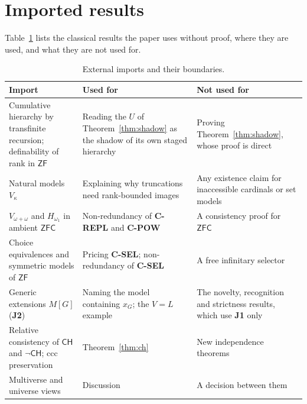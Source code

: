 \section{Imported results}\label{app:extended-material}

Table~\ref{tab:imports-ledger} lists the classical results the paper uses without proof, where
they are used, and what they are not used for.

\begin{table}[htbp]
\centering
\footnotesize
\begin{tabularx}{\textwidth}{@{}>{\raggedright\arraybackslash}p{}>{\raggedright\arraybackslash}p{}>{\raggedright\arraybackslash}X@{}}
\toprule
Import & Used for & Not used for \\
\midrule
Cumulative hierarchy by transfinite recursion; definability of rank in $\mathsf{ZF}$
\citep{Zermelo1930,Jech2003} & Reading the $U$ of Theorem~\ref{thm:shadow} as the shadow of its own staged hierarchy & Proving Theorem~\ref{thm:shadow}, whose proof is direct \\
Natural models $V_\kappa$ \citep{MontagueVaught1959} & Explaining why truncations need rank-bounded images & Any existence claim for inaccessible cardinals or set models \\
$V_{\omega+\omega}$ and $H_{\omega_1}$ in ambient $\mathsf{ZFC}$ \citep{Jech2003,GitmanHamkinsJohnstone2016} & Non-redundancy of \textbf{C-REPL} and \textbf{C-POW} & A consistency proof for $\mathsf{ZFC}$ \\
Choice equivalences and symmetric models of $\mathsf{ZF}$ \citep{Jech1973,Cohen1966} & Pricing \textbf{C-SEL}; non-redundancy of \textbf{C-SEL} & A free infinitary selector \\
Generic extensions $M[G]$ \citep{Cohen1966,Kunen2011} (\textbf{J2}) & Naming the model containing $x_G$; the $V=L$ example & The novelty, recognition and strictness results, which use \textbf{J1} only \\
Relative consistency of $\mathsf{CH}$ and $\neg\mathsf{CH}$; ccc preservation \citep{Godel1938,Godel1940,Cohen1963,Kunen2011} & Theorem~\ref{thm:ch} & New independence theorems \\
Multiverse and universe views \citep{Hamkins2012,Godel1947} & Discussion & A decision between them \\
\bottomrule
\end{tabularx}
\caption{External imports and their boundaries.}
\label{tab:imports-ledger}
\end{table}
